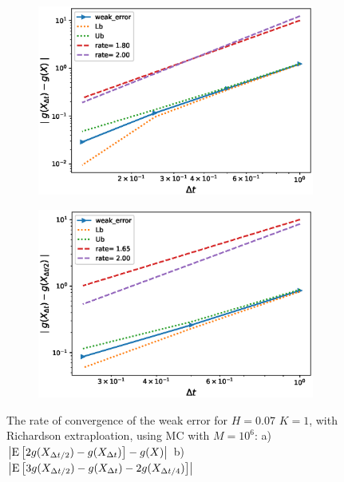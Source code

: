 \documentclass[11pt]{article}
\newcommand{\expt}[1]{\mathrm{E}\left[#1\right]}
\begin{document}
\begin{figure}[h!]
	\centering
	\begin{subfigure}{.4\textwidth}
		\centering
		\includegraphics[width=1\linewidth]{./figures/rBergomi_weak_error_rates/with_change_measure/with_rich/weak_convergence_order_Bergomi_H_007_K_1_M_10_5_CI_relative_measure_change_level_1_spec}
		\caption{}
		\label{fig:sub3}
	\end{subfigure}%
	\begin{subfigure}{.4\textwidth}
		\centering
		\includegraphics[width=1\linewidth]{./figures/rBergomi_weak_error_rates/with_change_measure/with_rich/weak_convergence_order_differences_Bergomi_H_007_K_1_M_10_5_CI_relative_measure_change_level_1_spec}
		\caption{}
		\label{fig:sub4}
	\end{subfigure}
	
	\caption{The rate of convergence of the weak error for $H=0.07$ $K=1$, with Richardson extraploation, using MC with $M=10^6$: a) $\abs{\expt{2 g(X_{\Delta t/2}) -g(X_{\Delta t})}-g(X)}$  b) $\abs{\expt{3 g(X_{\Delta t/2})-g(X_{\Delta t})-2 g(X_{\Delta t/4})}}$ }
	\label{fig:Weak_rate_H_007_with_rich_change_measure}
\end{figure}
\end{document}
